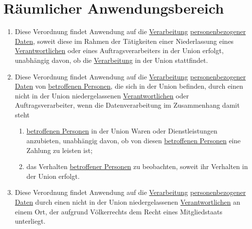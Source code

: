 \chapter{Räumlicher Anwendungsbereich}
\label{ch:3}


\begin{enumerate}

  \item Diese Verordnung findet Anwendung auf die \hyperref[itm:04-2]{Verarbeitung} \hyperref[itm:04-1]{personenbezogener Daten}, soweit
   diese im Rahmen der Tätigkeiten einer Niederlassung eines \hyperref[itm:04-7]{Verantwortlichen} oder eines Auftragsverarbeiters in der
   Union erfolgt, unabhängig davon, ob die \hyperref[itm:04-2]{Verarbeitung} in der Union stattfindet.
  \label{itm:03-1}

  \item Diese Verordnung findet Anwendung auf die \hyperref[itm:04-2]{Verarbeitung} \hyperref[itm:04-1]{personenbezogener Daten} von
   \hyperref[itm:04-1]{betroffenen Personen}, die sich in der Union befinden, durch einen nicht in der Union niedergelassenen
   \hyperref[itm:04-7]{Verantwortlichen} oder Auftragsverarbeiter, wenn die Datenverarbeitung im Zusammenhang damit steht
  \label{itm:03-2}

  \begin{enumerate}
  
    \item \hyperref[itm:04-1]{betroffenen Personen} in der Union Waren oder Dienstleistungen anzubieten, unabhängig davon, ob von diesen
     \hyperref[itm:04-1]{betroffenen Personen} eine Zahlung zu leisten ist;
    \label{itm:03-2a}

    \item das Verhalten \hyperref[itm:04-1]{betroffener Personen} zu beobachten, soweit ihr Verhalten in der Union erfolgt.
    \label{itm:03-2b}

  \end{enumerate}

  \item Diese Verordnung findet Anwendung auf die \hyperref[itm:04-2]{Verarbeitung} \hyperref[itm:04-1]{personenbezogener Daten} durch einen
   nicht in der Union niedergelassenen \hyperref[itm:04-7]{Verantwortlichen} an einem Ort, der aufgrund Völkerrechts dem Recht eines
   Mitgliedstaats unterliegt.
  \label{itm:03-3}

\end{enumerate}



